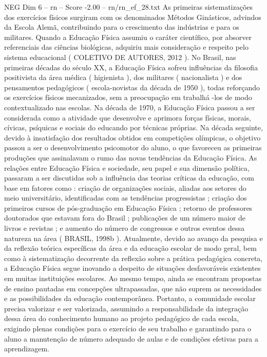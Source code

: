 \begin{textsample}{NEG Dim 6 – rn – Score -2.00 – rn/rn\_ef\_28.txt}
As primeiras sistematizações dos exercícios físicos surgiram com os denominados Métodos Ginásticos, advindos da Escola Alemã, contribuindo para o crescimento das indústrias e para os militares.
Quando a Educação Física assumiu o caráter científico, por absorver referenciais das ciências biológicas, adquiriu mais consideração e respeito pelo sistema educacional ( COLETIVO DE AUTORES, 2012 ).
No Brasil, nas primeiras décadas do século XX, a Educação Física sofreu influências da filosofia positivista da área médica ( higienista ), dos militares ( nacionalista ) e dos pensamentos pedagógicos ( escola-novistas da década de 1950 ), todas reforçando os exercícios físicos mecanizados, sem a preocupação em trabalhá -los de modo contextualizado nas escolas.
Na década de 1970, a Educação Física passou a ser considerada como a atividade que desenvolve e aprimora forças físicas, morais, cívicas, psíquicas e sociais do educando por técnicas próprias.
Na década seguinte, devido à insatisfação dos resultados obtidos em competições olímpicas, o objetivo passou a ser o desenvolvimento psicomotor do aluno, o que favoreceu as primeiras produções que assinalavam o rumo das novas tendências da Educação Física.
As relações entre Educação Física e sociedade, seu papel e sua dimensão política, passaram a ser discutidas sob a influência das teorias críticas da educação, com base em fatores como : criação de organizações sociais, aliadas aos setores do meio universitário, identificadas com as tendências progressistas ; criação dos primeiros cursos de pós-graduação em Educação Física ; retorno de professores doutorados que estavam fora do Brasil ; publicações de um número maior de livros e revistas ; e aumento do número de congressos e outros eventos dessa natureza na área ( BRASIL, 1998b ).
Atualmente, devido ao avanço da pesquisa e da reflexão teórica específicas da área e da educação escolar de modo geral, bem como à sistematização decorrente da reflexão sobre a prática pedagógica concreta, a Educação Física segue inovando a despeito de situações desfavoráveis existentes em muitas instituições escolares.
Ao mesmo tempo, ainda se encontram propostas de ensino pautadas em concepções ultrapassadas, que não suprem as necessidades e as possibilidades da educação contemporânea.
Portanto, a comunidade escolar precisa valorizar e ser valorizada, assumindo a responsabilidade da integração dessa área do conhecimento humano ao projeto pedagógico de cada escola, exigindo plenas condições para o exercício de seu trabalho e garantindo para o aluno a manutenção de número adequado de aulas e de condições efetivas para a aprendizagem.

\end{textsample}
